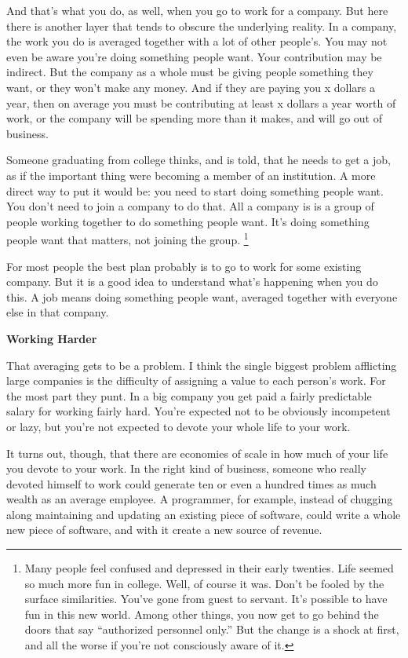 \documentclass[12pt]{book}
\begin{document}
And that's what you do, as well, when you go to work for a company. But
here there is another layer that tends to obscure the underlying
reality. In a company, the work you do is averaged together with a lot
of other people's. You may not even be aware you're doing something
people want. Your contribution may be indirect. But the company as a
whole must be giving people something they want, or they won't make any
money. And if they are paying you x dollars a year, then on average you
must be contributing at least x dollars a year worth of work, or the
company will be spending more than it makes, and will go out of
business.

Someone graduating from college thinks, and is told, that he needs to
get a job, as if the important thing were becoming a member of an
institution. A more direct way to put it would be: you need to start
doing something people want. You don't need to join a company to do
that. All a company is is a group of people working together to do
something people want. It's doing something people want that matters,
not joining the group. \footnote{Many people feel confused and depressed in their early twenties.
Life seemed so much more fun in college. Well, of course it was. Don't
be fooled by the surface similarities. You've gone from guest to
servant. It's possible to have fun in this new world. Among other
things, you now get to go behind the doors that say ``authorized
personnel only.'' But the change is a shock at first, and all the worse
if you're not consciously aware of it.}

For most people the best plan probably is to go to work for some
existing company. But it is a good idea to understand what's happening
when you do this. A job means doing something people want, averaged
together with everyone else in that company.

\textbf{Working Harder}

That averaging gets to be a problem. I think the single biggest problem
afflicting large companies is the difficulty of assigning a value to
each person's work. For the most part they punt. In a big company you
get paid a fairly predictable salary for working fairly hard. You're
expected not to be obviously incompetent or lazy, but you're not
expected to devote your whole life to your work.

It turns out, though, that there are economies of scale in how much of
your life you devote to your work. In the right kind of business,
someone who really devoted himself to work could generate ten or even a
hundred times as much wealth as an average employee. A programmer, for
example, instead of chugging along maintaining and updating an existing
piece of software, could write a whole new piece of software, and with
it create a new source of revenue.
\end{document}
